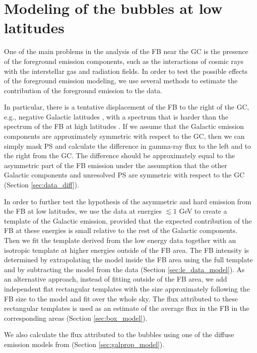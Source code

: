 
\section{Modeling of the \Fermi bubbles at low latitudes}

One of the main problems in the analysis of the FB near the GC is the 
presence of the foreground emission components, 
such as the interactions of cosmic rays with the interstellar gas and radiation fields.
In order to test the possible effects of the foreground emission modeling,
we use several methods to estimate the contribution of the foreground emission to the data.

In particular, there is a tentative
displacement of the FB to the right of the GC, e.g., negative Galactic latitudes \citep{2016ApJS..223...26A, 2017ApJ...840...43A},
with a spectrum that is harder than the spectrum of the FB at high latitudes \citep{2017ApJ...840...43A}.
If we assume that the Galactic emission components are approximately symmetric with respect to the GC,
then we can simply mask PS and calculate the difference in gamma-ray flux to the left and to the right from the GC.
The difference should be approximately equal to the asymmetric part of the FB emission
under the assumption that the other Galactic components and unresolved PS are symmetric with respect to the GC
(Section \ref{sec:data_diff}).

In order to further test the hypothesis of the asymmetric and hard emission from the FB at low latitudes,
we use the data at energies $\lesssim 1$ GeV to create a template of the Galactic emission,
provided that the expected contribution of the FB at these energies is small relative to the rest of the Galactic components.
Then we fit the template derived from the low energy data together with an isotropic template at higher energies
outside of the FB area.
The FB intensity is determined by extrapolating the model inside the FB area using the full template and by subtracting the model
from the data (Section \ref{sec:le_data_model}).
As an alternative approach, instead of fitting outside of the FB area, we add independent flat rectangular templates with the size
approximately following the FB size to the model and fit over the whole sky.
The flux attributed to these rectangular templates is used as an estimate of the average flux in the FB in the corresponding areas
(Section \ref{sec:box_model}).

We also calculate the flux attributed to the bubbles using one of the diffuse emission models from \citep{2017ApJ...840...43A}
(Section \ref{sec:galprop_model}).




